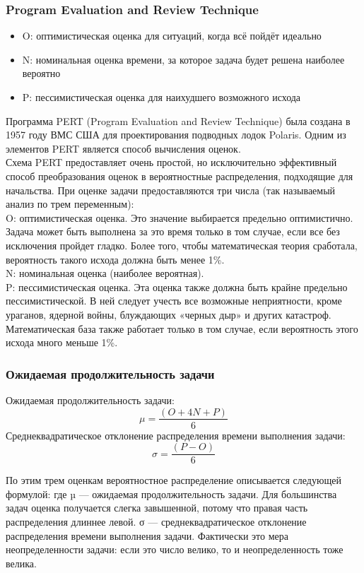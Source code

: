 \documentclass{../industrial-development}
\begin{document}
\begin{frame} \frametitle{Program Evaluation and Review Technique}
\begin{itemize}
  \item O: оптимистическая оценка для ситуаций, когда всё пойдёт идеально
	\item N: номинальная оценка времени, за которое задача будет решена наиболее вероятно
	\item P: пессимистическая оценка для наихудшего возможного исхода
\end{itemize}
\end{frame}
\lecturenotes
Программа PERT (Program Evaluation and Review Technique) была создана в 1957 году ВМС США для проектирования подводных лодок Polaris. Одним из элементов PERT является способ вычисления оценок.\\
Схема PERT предоставляет очень простой, но исключительно эффективный способ преобразования оценок в вероятностные распределения, подходящие для начальства. При оценке задачи предоставляются три числа (так называемый анализ по трем переменным):\\
O: оптимистическая оценка. Это значение выбирается предельно оптимистично. Задача может быть выполнена за это время только в том случае, если все без исключения пройдет гладко. Более того, чтобы математическая теория сработала, вероятность такого исхода должна быть менее 1\%.\\
N: номинальная оценка (наиболее вероятная).\\
P: пессимистическая оценка. Эта оценка также должна быть крайне предельно пессимистической. В ней следует учесть все возможные неприятности, кроме ураганов, ядерной войны, блуждающих «черных дыр» и других катастроф. Математическая база также работает
только в том случае, если вероятность этого исхода много меньше 1\%.

\begin{frame} \frametitle{Ожидаемая продолжительность задачи}
	Ожидаемая продолжительность задачи:
	\[\mu = \frac{(O + 4N + P)}6\]
	Среднеквадратическое отклонение распределения времени выполнения задачи:
	\[\sigma = \frac{(P-O)}6\]
\end{frame}
\lecturenotes
По этим трем оценкам вероятностное распределение описывается следующей формулой: где µ — ожидаемая продолжительность задачи. Для большинства задач оценка получается слегка завышенной, потому что правая часть распределения длиннее левой.
σ — среднеквадратическое отклонение распределения времени выполнения задачи. Фактически это мера неопределенности задачи: если
это число велико, то и неопределенность тоже велика. 
\end{document}
